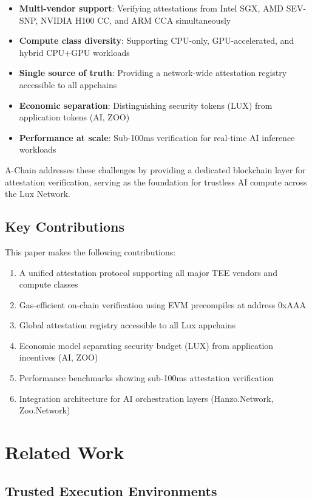 \documentclass[11pt,a4paper]{article}
\begin{document}
\begin{itemize}
\item \textbf{Multi-vendor support}: Verifying attestations from Intel SGX, AMD SEV-SNP, NVIDIA H100 CC, and ARM CCA simultaneously
\item \textbf{Compute class diversity}: Supporting CPU-only, GPU-accelerated, and hybrid CPU+GPU workloads
\item \textbf{Single source of truth}: Providing a network-wide attestation registry accessible to all appchains
\item \textbf{Economic separation}: Distinguishing security tokens (LUX) from application tokens (AI, ZOO)
\item \textbf{Performance at scale}: Sub-100ms verification for real-time AI inference workloads
\end{itemize}

A-Chain addresses these challenges by providing a dedicated blockchain layer for attestation verification, serving as the foundation for trustless AI compute across the Lux Network.

\subsection{Key Contributions}

This paper makes the following contributions:

\begin{enumerate}
\item A unified attestation protocol supporting all major TEE vendors and compute classes
\item Gas-efficient on-chain verification using EVM precompiles at address 0xAAA
\item Global attestation registry accessible to all Lux appchains
\item Economic model separating security budget (LUX) from application incentives (AI, ZOO)
\item Performance benchmarks showing sub-100ms attestation verification
\item Integration architecture for AI orchestration layers (Hanzo.Network, Zoo.Network)
\end{enumerate}

\section{Related Work}

\subsection{Trusted Execution Environments}
\end{document}
